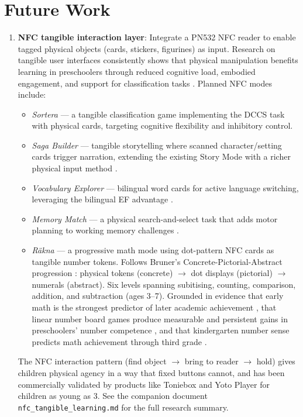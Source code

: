 \documentclass[12pt, a4paper]{article}
\begin{document}
\section{Future Work}
\label{sec:future}

\begin{enumerate}
  \item \textbf{NFC tangible interaction layer}: Integrate a PN532 NFC reader to
    enable tagged physical objects (cards, stickers, figurines) as input.
    Research on tangible user interfaces consistently shows that physical
    manipulation benefits learning in preschoolers through reduced cognitive load,
    embodied engagement, and support for classification tasks
    \citep{marshall2007tangible, antle2013embodied, manches2012tangibles}. Planned
    NFC modes include:
    \begin{itemize}[noitemsep]
      \item \emph{Sortera} --- a tangible classification game implementing the DCCS
        task \citep{zelazo2006dccs} with physical cards, targeting cognitive
        flexibility and inhibitory control.
      \item \emph{Saga Builder} --- tangible storytelling where scanned
        character/setting cards trigger narration, extending the existing Story
        Mode with a richer physical input method
        \citep{sylla2012tinkrbook}.
      \item \emph{Vocabulary Explorer} --- bilingual word cards for active
        language switching, leveraging the bilingual EF advantage
        \citep{bialystok2011reshaping}.
      \item \emph{Memory Match} --- a physical search-and-select task that adds
        motor planning to working memory challenges
        \citep{manches2012tangibles}.
      \item \emph{R\"akna} --- a progressive math mode using dot-pattern NFC
        cards as tangible number tokens. Follows Bruner's
        Concrete-Pictorial-Abstract progression
        \citep{bruner1966instruction}: physical tokens (concrete)
        $\to$ dot displays (pictorial) $\to$ numerals (abstract). Six
        levels spanning subitising, counting, comparison, addition, and
        subtraction (ages 3--7). Grounded in evidence that early math
        is the strongest predictor of later academic achievement
        \citep{duncan2007school}, that linear number board games
        produce measurable and persistent gains in preschoolers'
        number competence \citep{siegler2009playing}, and that
        kindergarten number sense predicts math achievement through
        third grade \citep{jordan2009early}.
    \end{itemize}
    The NFC interaction pattern (find object $\to$ bring to reader $\to$ hold)
    gives children physical agency in a way that fixed buttons cannot, and has
    been commercially validated by products like Toniebox and Yoto Player for
    children as young as 3. See the companion document
    \texttt{nfc\_tangible\_learning.md} for the full research summary.


\end{enumerate}
\end{document}
